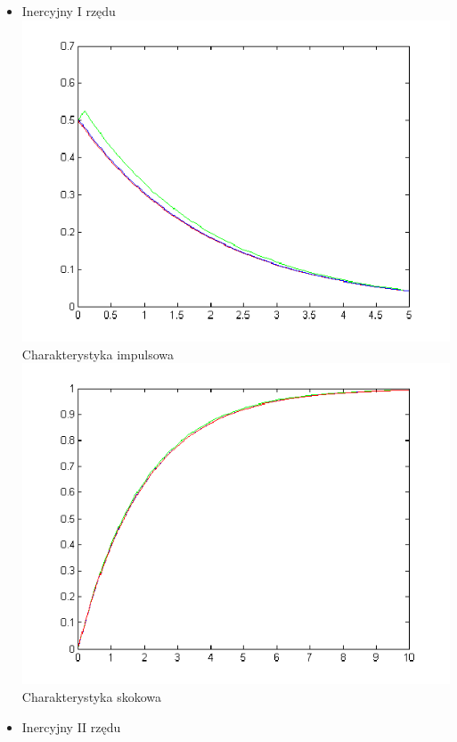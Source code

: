 \documentclass[a4paper,10pt]{article}
\begin{document}
\begin{itemize}
\newpage 
\begin{itemize}
\item Inercyjny I rzędu
\newline \includegraphics[scale=0.9]{CW1-inercyjny1-mimpuls.png}\newline Charakterystyka impulsowa
\newline \includegraphics[scale=0.9]{CW1-inercyjny1-mskok.png}\newline Charakterystyka skokowa
\newpage  
\item Inercyjny II rzędu

\end{itemize}
\end{itemize}
\end{document}

